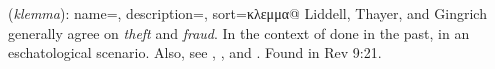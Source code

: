 \item[Fraud,]

(\textit{klemma}):
{
    name=,
    description={},
    sort=κλεμμα@
}
Liddell, Thayer, and Gingrich generally agree on \emph{theft} and \emph{fraud}. In the context of done in the past, in an eschatological scenario. Also, see , , and .
Found in Rev 9:21.
